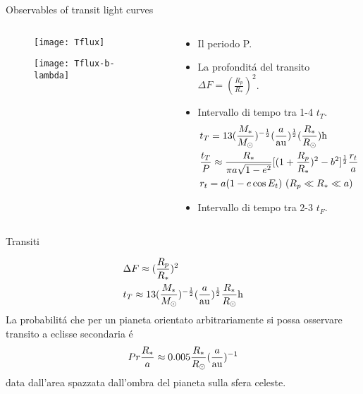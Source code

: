 \begin{frame}{Observables of transit light curves}
\begin{columns}[c]\begin{column}{0.4\textwidth}
\begin{figure}[!ht]\texttt{[image: Tflux]}\label{fig:Tflux}\end{figure}
\begin{figure}[!ht]\texttt{[image: Tflux-b-lambda]}\label{fig:Tflux-b-lambda}\end{figure}
\end{column}
\begin{column}{0.6\textwidth}
\begin{itemize}
    \item Il periodo P.
    \item La profondit\'a del transito $\Delta F=(\frac{R_p}{R_*})^2$.
    \item Intervallo di tempo tra 1-4 $t_T$.
    \begin{align*}
    &t_T=13(\frac{M_*}{\msun{}})\expy{-\frac{1}{2}}(\frac{a}{\si{\astronomicalunit}})\expy{\frac{1}{2}}(\frac{R_*}{\rsun{}})\si{\hour}\\
    &\frac{t_T}{P}\approx\frac{R_*}{\pi a\sqrt{1-e^2}}[(1+\frac{R_p}{R_*})^2-b^2]^{\frac{1}{2}}\frac{r_t}{a}\\
    &r_t=a(1-e\cos{E_t})\ (R_p\ll R_*\ll a)
    \end{align*}
    \item Intervallo di tempo tra 2-3 $t_F$.
\end{itemize}
\end{column}\end{columns}
\end{frame}

\begin{frame}{Transiti}

\begin{align*}
&\Delta F\approx(\frac{R_p}{R_*})^2\\
&t_T\approx13(\frac{M_*}{\msun{}})\expy{-\frac{1}{2}}(\frac{a}{\si{\astronomicalunit}})\expy{\frac{1}{2}}\frac{R_*}{\rsun{}}\si{\hour}
\end{align*}
La probabilit\'a che per un pianeta orientato arbitrariamente si possa osservare transito a eclisse secondaria \'e
\begin{equation*}
Pr\frac{R_*}{a}\approx0.005\frac{R_*}{\rsun{}}(\frac{a}{\si{\astronomicalunit}})\expy{-1}
\end{equation*}
data dall'area spazzata dall'ombra del pianeta sulla sfera celeste.
\end{frame}


